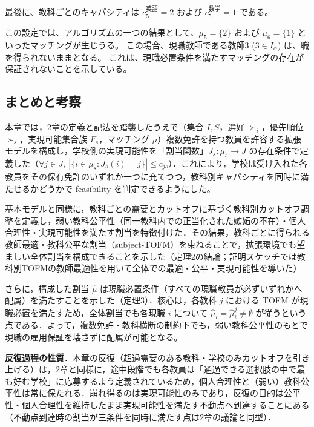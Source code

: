 \documentclass[12pt, a4paper]{article}
\theoremstyle{definition}
\theoremstyle{remark}
\theoremstyle{plain}
\begin{document}
最後に、教科ごとのキャパシティは $c_5^{\text{英語}} = 2$ および $c_5^{\text{数学}} = 1$ である。

この設定では、アルゴリズムの一つの結果として、$\mu_5 = \{2\}$ および $\mu_6 = \{1\}$ といったマッチングが生じうる。
この場合、現職教師である教師3 ($3 \in I_\alpha$) は、職を得られないままとなる。
これは、現職必置条件を満たすマッチングの存在が保証されないことを示している。





\subsection{まとめと考察}

本章では，2章の定義と記法を踏襲したうえで（集合 $I,S$，選好 $\succ_i$，優先順位 $\succ_s$，実現可能集合族 $F_s$，マッチング $\mu$）複数免許を持つ教員を許容する拡張モデルを構成し，学校側の実現可能性を「割当関数」$J_s:\mu_s\to J$ の存在条件で定義した（$\forall j\in J,\ |\{i\in \mu_s: J_s(i)=j\}| \le c_{js}$）．これにより，学校は受け入れた各教員をその保有免許のいずれか一つに充てつつ，教科別キャパシティを同時に満たせるかどうかで feasibility を判定できるようにした。

基本モデルと同様に，教科ごとの需要とカットオフに基づく教科別カットオフ調整を定義し，弱い教科公平性（同一教科内での正当化された嫉妬の不在）・個人合理性・実現可能性を満たす割当を特徴付けた．その結果，教科ごとに得られる教師最適・教科公平な割当（subject-TOFM）を束ねることで，拡張環境でも望ましい全体割当を構成できることを示した（定理2の結論；証明スケッチでは教科別TOFMの教師最適性を用いて全体での最適・公平・実現可能性を導いた）

さらに，構成した割当 $\hat{\mu}$ は現職必置条件（すべての現職教員が必ずいずれかへ配属）を満たすことを示した（定理3）．核心は，各教科 $j$ における TOFM が現職必置を満たすため，全体割当でも各現職 $i$ について $\hat{\mu}_i=\hat{\mu}^j_i\neq\emptyset$ が従うという点である．よって，複数免許・教科横断の制約下でも，弱い教科公平性のもとで現職の雇用保証を壊さずに配属が可能となる。

\medskip
\noindent\textbf{反復過程の性質}．本章の反復（超過需要のある教科・学校のみカットオフを引き上げる）は，2章と同様に，途中段階でも各教員は「通過できる選択肢の中で最も好む学校」に応募するよう定義されているため，個人合理性と（弱い）教科公平性は常に保たれる．崩れ得るのは実現可能性のみであり，反復の目的は公平性・個人合理性を維持したまま実現可能性を満たす不動点へ到達することにある（不動点到達時の割当が三条件を同時に満たす点は2章の議論と同型）．
\end{document}
